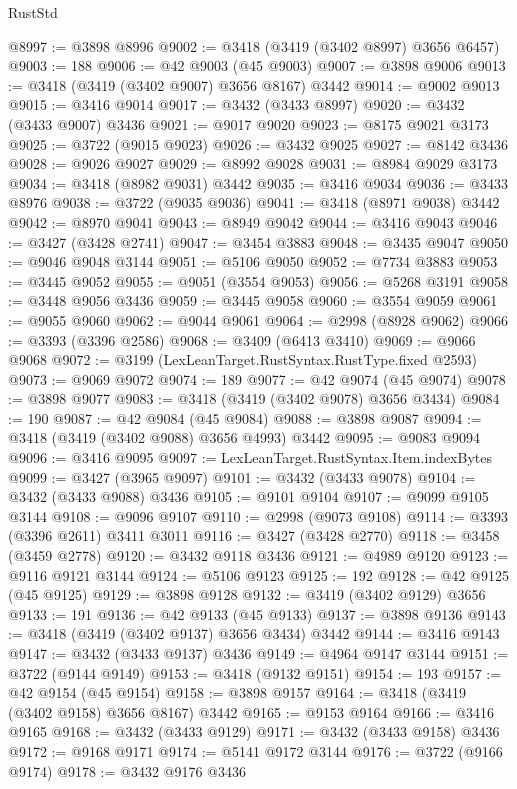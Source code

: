 \begin{lexlean}{RustStd}
\begin{coremodule}
@8997 := @3898 @8996
@9002 := @3418 (@3419 (@3402 @8997) @3656 @6457)
@9003 := 188
@9006 := @42 @9003 (@45 @9003)
@9007 := @3898 @9006
@9013 := @3418 (@3419 (@3402 @9007) @3656 @8167) @3442
@9014 := @9002 @9013
@9015 := @3416 @9014
@9017 := @3432 (@3433 @8997)
@9020 := @3432 (@3433 @9007) @3436
@9021 := @9017 @9020
@9023 := @8175 @9021 @3173
@9025 := @3722 (@9015 @9023)
@9026 := @3432 @9025
@9027 := @8142 @3436
@9028 := @9026 @9027
@9029 := @8992 @9028
@9031 := @8984 @9029 @3173
@9034 := @3418 (@8982 @9031) @3442
@9035 := @3416 @9034
@9036 := @3433 @8976
@9038 := @3722 (@9035 @9036)
@9041 := @3418 (@8971 @9038) @3442
@9042 := @8970 @9041
@9043 := @8949 @9042
@9044 := @3416 @9043
@9046 := @3427 (@3428 @2741)
@9047 := @3454 @3883
@9048 := @3435 @9047
@9050 := @9046 @9048 @3144
@9051 := @5106 @9050
@9052 := @7734 @3883
@9053 := @3445 @9052
@9055 := @9051 (@3554 @9053)
@9056 := @5268 @3191
@9058 := @3448 @9056 @3436
@9059 := @3445 @9058
@9060 := @3554 @9059
@9061 := @9055 @9060
@9062 := @9044 @9061
@9064 := @2998 (@8928 @9062)
@9066 := @3393 (@3396 @2586)
@9068 := @3409 (@6413 @3410)
@9069 := @9066 @9068
@9072 := @3199 (LexLeanTarget.RustSyntax.RustType.fixed @2593)
@9073 := @9069 @9072
@9074 := 189
@9077 := @42 @9074 (@45 @9074)
@9078 := @3898 @9077
@9083 := @3418 (@3419 (@3402 @9078) @3656 @3434)
@9084 := 190
@9087 := @42 @9084 (@45 @9084)
@9088 := @3898 @9087
@9094 := @3418 (@3419 (@3402 @9088) @3656 @4993) @3442
@9095 := @9083 @9094
@9096 := @3416 @9095
@9097 := LexLeanTarget.RustSyntax.Item.indexBytes
@9099 := @3427 (@3965 @9097)
@9101 := @3432 (@3433 @9078)
@9104 := @3432 (@3433 @9088) @3436
@9105 := @9101 @9104
@9107 := @9099 @9105 @3144
@9108 := @9096 @9107
@9110 := @2998 (@9073 @9108)
@9114 := @3393 (@3396 @2611) @3411 @3011
@9116 := @3427 (@3428 @2770)
@9118 := @3458 (@3459 @2778)
@9120 := @3432 @9118 @3436
@9121 := @4989 @9120
@9123 := @9116 @9121 @3144
@9124 := @5106 @9123
@9125 := 192
@9128 := @42 @9125 (@45 @9125)
@9129 := @3898 @9128
@9132 := @3419 (@3402 @9129) @3656
@9133 := 191
@9136 := @42 @9133 (@45 @9133)
@9137 := @3898 @9136
@9143 := @3418 (@3419 (@3402 @9137) @3656 @3434) @3442
@9144 := @3416 @9143
@9147 := @3432 (@3433 @9137) @3436
@9149 := @4964 @9147 @3144
@9151 := @3722 (@9144 @9149)
@9153 := @3418 (@9132 @9151)
@9154 := 193
@9157 := @42 @9154 (@45 @9154)
@9158 := @3898 @9157
@9164 := @3418 (@3419 (@3402 @9158) @3656 @8167) @3442
@9165 := @9153 @9164
@9166 := @3416 @9165
@9168 := @3432 (@3433 @9129)
@9171 := @3432 (@3433 @9158) @3436
@9172 := @9168 @9171
@9174 := @5141 @9172 @3144
@9176 := @3722 (@9166 @9174)
@9178 := @3432 @9176 @3436

\end{coremodule}
\end{lexlean}
